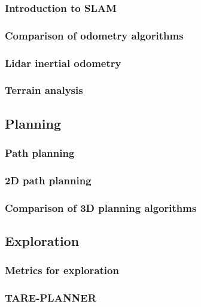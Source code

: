 \documentclass[11pt]{article}
\begin{document}
            \subsubsection{Introduction to SLAM}
            \subsubsection{Comparison of odometry algorithms}
            \subsubsection{Lidar inertial odometry}
            \subsubsection{Terrain analysis}
        \subsection{Planning}
            \subsubsection{Path planning}
            \subsubsection{2D path planning}
            \subsubsection{Comparison of 3D planning algorithms}

        \subsection{Exploration}
            \subsubsection{Metrics for exploration}
            \subsubsection{TARE-PLANNER}
\end{document}

